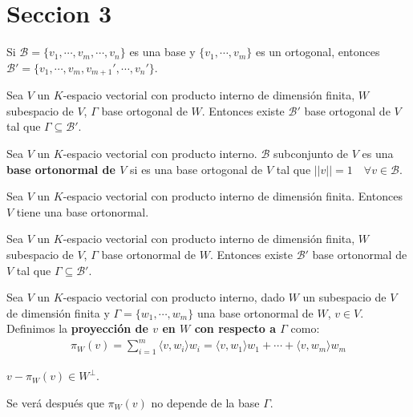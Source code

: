 \section{Seccion 3}

\begin{obs}{}{}{}{}
    Si $\mathcal{B} = \{v_1, \cdots, v_m, \cdots, v_n\}$ es una base y $\{v_1, \cdots, v_m\}$ es un ortogonal, entonces $\mathcal{B}' = \{v_1, \cdots, v_m, v_{m+1}', \cdots, v_n'\}$.
\end{obs}
\begin{corollary}{}{}
    Sea $V$ un $K$-espacio vectorial con producto interno de dimensión finita, $W$ subespacio de $V$, $\Gamma$ base ortogonal de $W$. Entonces existe $\mathcal{B}'$ base ortogonal de $V$ tal que $\Gamma \subseteq \mathcal{B}'$.
\end{corollary}
\begin{definition}{}{}
    Sea $V$ un $K$-espacio vectorial con producto interno. $\mathcal{B}$ subconjunto de $V$ es una \textbf{base ortonormal de $V$} si es una base ortogonal de $V$ tal que $||v|| = 1 \quad \forall v \in \mathcal{B}$.
\end{definition}
\begin{corollary}{}{}
    Sea $V$ un $K$-espacio vectorial con producto interno de dimensión finita. Entonces $V$ tiene una base ortonormal.
\end{corollary}
\begin{corollary}{}{}
    Sea $V$ un $K$-espacio vectorial con producto interno de dimensión finita, $W$ subespacio de $V$, $\Gamma$ base ortonormal de $W$. Entonces existe $\mathcal{B}'$ base ortonormal de $V$ tal que $\Gamma \subseteq \mathcal{B}'$.
\end{corollary}
\begin{definition}{}{}
    Sea $V$ un $K$-espacio vectorial con producto interno, dado $W$ un subespacio de $V$ de dimensión finita y $\Gamma = \{w_1, \cdots, w_m\}$ una base ortonormal de $W$, $v \in V$. Definimos la \textbf{proyección de $v$ en $W$ con respecto a $\Gamma$} como:
    \begin{align*}
        \pi_{W}(v) = \sum_{i=1}^{m} \langle v,w_i \rangle w_i = \langle v,w_1 \rangle w_1 + \cdots + \langle v,w_m \rangle w_m 
    \end{align*}
\end{definition}
\begin{obs}{}{}
    $v - \pi_{W}(v) \in W^\perp$.
\end{obs}
\begin{obs}{}{}
    Se verá después que $\pi_{W}(v)$ no depende de la base $\Gamma$.
\end{obs}
